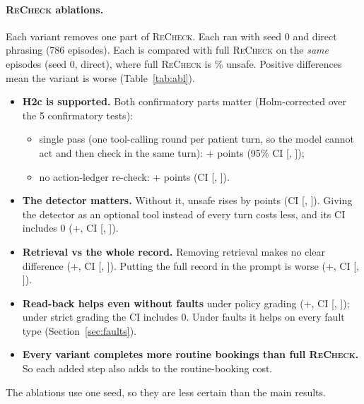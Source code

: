 \documentclass[10pt]{article}
\newcommand{\recheck}{\textsc{ReCheck}}
\begin{document}
\paragraph{\recheck{} ablations.} Each variant removes one part of \recheck{}. Each ran with seed 0 and direct phrasing (786 episodes). Each is compared with full \recheck{} on the \emph{same} episodes (seed 0, direct), where full \recheck{} is \ablBasePolicy\% unsafe. Positive differences mean the variant is worse (Table~\ref{tab:abl}).
\begin{itemize}
\item \textbf{H2c is supported.} Both confirmatory parts matter (Holm-corrected over the 5 confirmatory tests):
  \begin{itemize}
  \item single pass (one tool-calling round per patient turn, so the model cannot act and then check in the same turn): +\ablsinglepassDiff{} points (95\% CI [\ablsinglepassLo, \ablsinglepassHi]);
  \item no action-ledger re-check: +\ablnoledgerDiff{} points (CI [\ablnoledgerLo, \ablnoledgerHi]).
  \end{itemize}
\item \textbf{The detector matters.} Without it, unsafe rises by \ablnodetectorDiff{} points (CI [\ablnodetectorLo, \ablnodetectorHi]). Giving the detector as an optional tool instead of every turn costs less, and its CI includes 0 (+\abldetectortoolDiff{}, CI [\abldetectortoolLo, \abldetectortoolHi]).
\item \textbf{Retrieval vs the whole record.} Removing retrieval makes no clear difference (+\ablnoretrievalDiff{}, CI [\ablnoretrievalLo, \ablnoretrievalHi]). Putting the full record in the prompt is worse (+\ablfullrecordDiff{}, CI [\ablfullrecordLo, \ablfullrecordHi]).
\item \textbf{Read-back helps even without faults} under policy grading (+\ablnoreadbackDiff{}, CI [\ablnoreadbackLo, \ablnoreadbackHi]); under strict grading the CI includes 0. Under faults it helps on every fault type (Section~\ref{sec:faults}).
\item \textbf{Every variant completes more routine bookings than full \recheck{}.} So each added step also adds to the routine-booking cost.
\end{itemize}
The ablations use one seed, so they are less certain than the main results.

\begin{table}[htbp]\centering\small\resizebox{\linewidth}{!}{}
\caption{\recheck{} ablations (seed 0, direct phrasing, core episodes). $\Delta$: paired scenario-level difference in policy-unsafe against full \recheck{} on the same episodes.}\label{tab:abl}\end{table}
\end{document}
